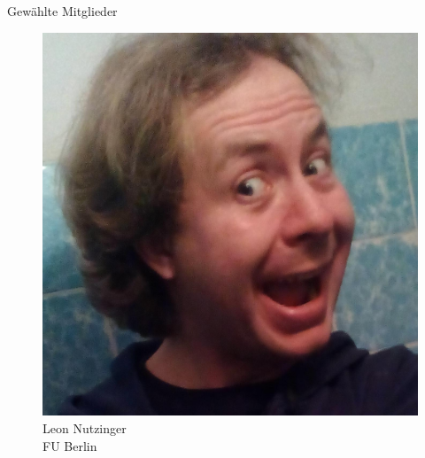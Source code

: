 \documentclass[compress, aspectratio=169]{beamer}
\begin{document}
\begin{frame}{Gewählte Mitglieder}
\begin{minipage}{.28\textwidth}
\begin{figure}
\begin{minipage}[r]{.57\textwidth}
        \includegraphics[height=0.3\textheight]{leon.jpg}
      \end{minipage} \hfill
      \begin{minipage}[c]{.4\textwidth}
        \caption*{Leon Nutzinger \\FU Berlin}
      \end{minipage}
    \end{figure}
  \end{minipage}


\end{frame}
\end{document}
